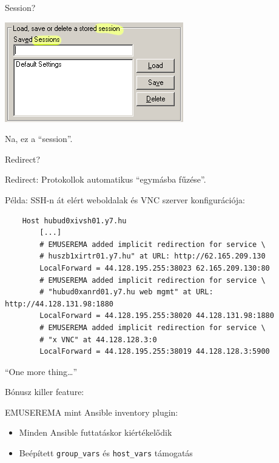 \documentclass[aspectratio=169]{beamer}
\begin{document}
\begin{frame}{Session?}
			\begin{center}

				 \includegraphics[scale=0.4]{putty-zoom.png}

		\pause

		Na, ez a ``session''.

			 \end{center}
\end{frame}

\begin{frame}[fragile]{Redirect?}


	Redirect: Protokollok automatikus ``egymásba fűzése''.

	\pause

	Példa: SSH-n át elért weboldalak és VNC szerver konfigurációja:

	\pause

	\begin{verbatim}
    Host hubud0xivsh01.y7.hu
        [...]
        # EMUSEREMA added implicit redirection for service \
        # huszb1xirtr01.y7.hu" at URL: http://62.165.209.130
        LocalForward = 44.128.195.255:38023 62.165.209.130:80
        # EMUSEREMA added implicit redirection for service \
        # "hubud0xanrd01.y7.hu web mgmt" at URL: http://44.128.131.98:1880
        LocalForward = 44.128.195.255:38020 44.128.131.98:1880
        # EMUSEREMA added implicit redirection for service \
        # "x VNC" at 44.128.128.3:0
        LocalForward = 44.128.195.255:38019 44.128.128.3:5900

\end{verbatim}
\end{frame}

\begin{frame}{``One more thing\ldots''}

	Bónusz killer feature:

	\pause

	EMUSEREMA mint Ansible inventory plugin:
	\pause
		\begin{itemize}
			\item Minden Ansible futtatáskor kiértékelődik
			\pause
			\item Beépített \texttt{group\_vars} és \texttt{host\_vars} támogatás
		\end{itemize}
\end{frame}
\end{document}
